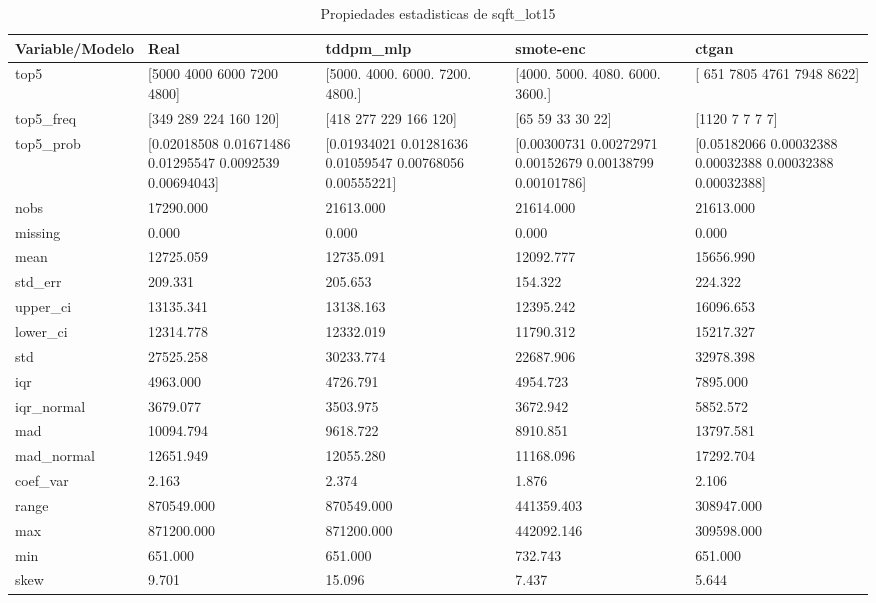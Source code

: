 \begin{table}[H]
\centering
\caption{Propiedades  estadisticas de sqft_lot15}
\label{table-stats-sqft_lot15}
\begin{tabular}{|l|m{10em}|m{10em}|m{10em}|m{10em}|}
\hline
 \rowcolor[gray]{0.8}
Variable/Modelo & Real & tddpm\_mlp & smote-enc & ctgan \\
\hline top5 & [5000 4000 6000 7200 4800] & [5000. 4000. 6000. 7200. 4800.] & [4000. 5000. 4080. 6000. 3600.] & [ 651 7805 4761 7948 8622] \\
\hline top5\_freq & [349 289 224 160 120] & [418 277 229 166 120] & [65 59 33 30 22] & [1120    7    7    7    7] \\
\hline top5\_prob & [0.02018508 0.01671486 0.01295547 0.0092539  0.00694043] & [0.01934021 0.01281636 0.01059547 0.00768056 0.00555221] & [0.00300731 0.00272971 0.00152679 0.00138799 0.00101786] & [0.05182066 0.00032388 0.00032388 0.00032388 0.00032388] \\
\hline nobs & 17290.000 & 21613.000 & 21614.000 & 21613.000 \\
\hline missing & 0.000 & 0.000 & 0.000 & 0.000 \\
\hline mean & 12725.059 & 12735.091 & 12092.777 & 15656.990 \\
\hline std\_err & 209.331 & 205.653 & 154.322 & 224.322 \\
\hline upper\_ci & 13135.341 & 13138.163 & 12395.242 & 16096.653 \\
\hline lower\_ci & 12314.778 & 12332.019 & 11790.312 & 15217.327 \\
\hline std & 27525.258 & 30233.774 & 22687.906 & 32978.398 \\
\hline iqr & 4963.000 & 4726.791 & 4954.723 & 7895.000 \\
\hline iqr\_normal & 3679.077 & 3503.975 & 3672.942 & 5852.572 \\
\hline mad & 10094.794 & 9618.722 & 8910.851 & 13797.581 \\
\hline mad\_normal & 12651.949 & 12055.280 & 11168.096 & 17292.704 \\
\hline coef\_var & 2.163 & 2.374 & 1.876 & 2.106 \\
\hline range & 870549.000 & 870549.000 & 441359.403 & 308947.000 \\
\hline max & 871200.000 & 871200.000 & 442092.146 & 309598.000 \\
\hline min & 651.000 & 651.000 & 732.743 & 651.000 \\
\hline skew & 9.701 & 15.096 & 7.437 & 5.644 \\

\end{tabular}
\end{table}
